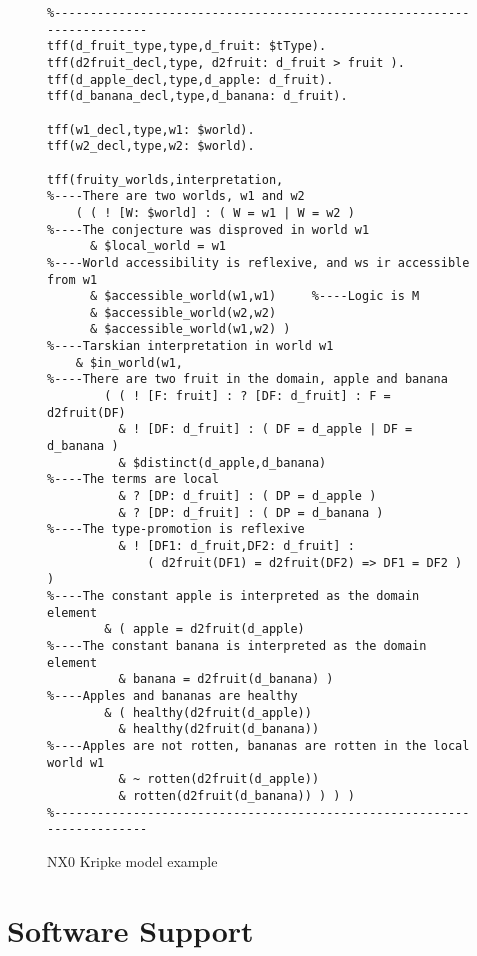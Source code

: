 \documentclass[runningheads]{llncs}
\begin{document}
\begin{figure}[h!]
\small
{}
\begin{verbatim}
%------------------------------------------------------------------------
tff(d_fruit_type,type,d_fruit: $tType).
tff(d2fruit_decl,type, d2fruit: d_fruit > fruit ).
tff(d_apple_decl,type,d_apple: d_fruit).
tff(d_banana_decl,type,d_banana: d_fruit).

tff(w1_decl,type,w1: $world).
tff(w2_decl,type,w2: $world).

tff(fruity_worlds,interpretation,
%----There are two worlds, w1 and w2
    ( ( ! [W: $world] : ( W = w1 | W = w2 )
%----The conjecture was disproved in world w1
      & $local_world = w1
%----World accessibility is reflexive, and ws ir accessible from w1
      & $accessible_world(w1,w1)     %----Logic is M
      & $accessible_world(w2,w2)
      & $accessible_world(w1,w2) )
%----Tarskian interpretation in world w1
    & $in_world(w1,
%----There are two fruit in the domain, apple and banana
        ( ( ! [F: fruit] : ? [DF: d_fruit] : F = d2fruit(DF)
          & ! [DF: d_fruit] : ( DF = d_apple | DF = d_banana )
          & $distinct(d_apple,d_banana)
%----The terms are local
          & ? [DP: d_fruit] : ( DP = d_apple )
          & ? [DP: d_fruit] : ( DP = d_banana )
%----The type-promotion is reflexive
          & ! [DF1: d_fruit,DF2: d_fruit] :
              ( d2fruit(DF1) = d2fruit(DF2) => DF1 = DF2 ) )
%----The constant apple is interpreted as the domain element
        & ( apple = d2fruit(d_apple)
%----The constant banana is interpreted as the domain element
          & banana = d2fruit(d_banana) )
%----Apples and bananas are healthy
        & ( healthy(d2fruit(d_apple))
          & healthy(d2fruit(d_banana))
%----Apples are not rotten, bananas are rotten in the local world w1
          & ~ rotten(d2fruit(d_apple))
          & rotten(d2fruit(d_banana)) ) ) )
%------------------------------------------------------------------------
\end{verbatim}
\caption{NX0 Kripke model example}
\label{NX0Kripke}
\end{figure}

\section{Software Support}
\label{SystemsTools}
\end{document}
